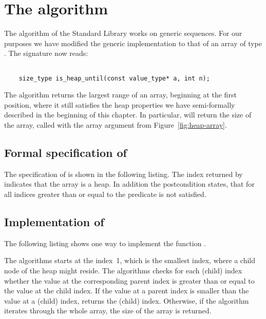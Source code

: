 
\section{The \isheapuntil algorithm}

The \isheapuntil algorithm of the \cxx Standard Library \cite[\S
28.7.7.5]{cxx-17-draft} works on generic sequences. 
For our purposes we have modified the generic implementation
to that of an array of type .
The signature now reads:

\begin{lstlisting}[style = acsl-block]

    size_type is_heap_until(const value_type* a, int n);
\end{lstlisting}

The algorithm \isheapuntil returns the largest range of an array, beginning at the first position, where it still satisfies the heap properties
we have semi-formally described in the beginning of this chapter.
In particular, \isheapuntil will return the size of the array,
called with the array argument from Figure~\ref{fig:heap-array}.

\clearpage

\subsection{Formal specification of \isheapuntil}

The specification of \isheapuntil is shown in the following listing.
The index \inl{\\result} returned by \isheapuntil indicates
that the array  is a heap.
In addition the postcondition  states, that for all indices
greater than or equal to  the predicate  is not satisfied.



\subsection{Implementation of \isheapuntil}

The following listing shows one way to implement the function \isheapuntil.



The algorithms starts at the index~1, which is the smallest index,
where a child node of the heap might reside.
The algorithms checks for each (child) index whether
the value at the corresponding parent index 
is greater than or equal to the value at the child index.
If the value at a parent index is smaller than the value at a (child) index,
\isheapuntil returns the (child) index.
Otherwise, if the algorithm iterates through the whole array,
the size of the array is returned.
